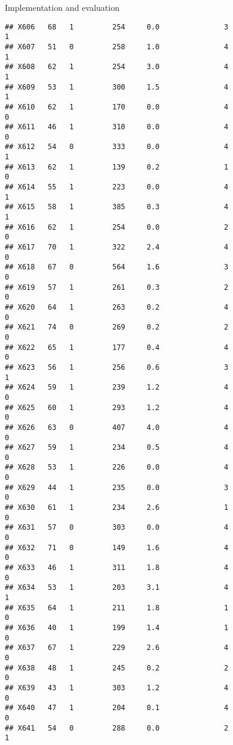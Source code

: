 \documentclass[
  ignorenonframetext,
]{beamer}
\begin{document}
\begin{frame}[fragile]{Implementation and evaluation}
\begin{verbatim}
## X606   68   1         254     0.0               3                   1
## X607   51   0         258     1.0               4                   1
## X608   62   1         254     3.0               4                   1
## X609   53   1         300     1.5               4                   1
## X610   62   1         170     0.0               4                   0
## X611   46   1         310     0.0               4                   0
## X612   54   0         333     0.0               4                   1
## X613   62   1         139     0.2               1                   0
## X614   55   1         223     0.0               4                   1
## X615   58   1         385     0.3               4                   1
## X616   62   1         254     0.0               2                   0
## X617   70   1         322     2.4               4                   0
## X618   67   0         564     1.6               3                   0
## X619   57   1         261     0.3               2                   0
## X620   64   1         263     0.2               4                   0
## X621   74   0         269     0.2               2                   0
## X622   65   1         177     0.4               4                   0
## X623   56   1         256     0.6               3                   1
## X624   59   1         239     1.2               4                   0
## X625   60   1         293     1.2               4                   0
## X626   63   0         407     4.0               4                   0
## X627   59   1         234     0.5               4                   0
## X628   53   1         226     0.0               4                   0
## X629   44   1         235     0.0               3                   0
## X630   61   1         234     2.6               1                   0
## X631   57   0         303     0.0               4                   0
## X632   71   0         149     1.6               4                   0
## X633   46   1         311     1.8               4                   0
## X634   53   1         203     3.1               4                   1
## X635   64   1         211     1.8               1                   0
## X636   40   1         199     1.4               1                   0
## X637   67   1         229     2.6               4                   0
## X638   48   1         245     0.2               2                   0
## X639   43   1         303     1.2               4                   0
## X640   47   1         204     0.1               4                   0
## X641   54   0         288     0.0               2                   1

\end{verbatim}
\end{frame}
\end{document}
